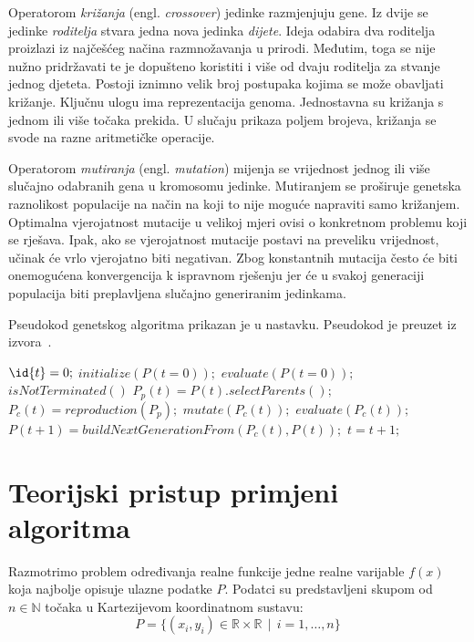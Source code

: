 \documentclass[times, utf8, seminar, numeric]{fer}
\begin{document}
Operatorom \textit{križanja} (engl. \textit{crossover}) jedinke razmjenjuju gene.
Iz dvije se jedinke \textit{roditelja} stvara jedna nova jedinka \textit{dijete}.
Ideja odabira dva roditelja proizlazi iz najčešćeg načina razmnožavanja u prirodi.
Međutim, toga se nije nužno pridržavati te je dopušteno koristiti i više od dvaju roditelja za stvanje jednog djeteta.
Postoji iznimno velik broj postupaka kojima se može obavljati križanje.
Ključnu ulogu ima reprezentacija genoma.
Jednostavna su križanja s jednom ili više točaka prekida.
U slučaju prikaza poljem brojeva, križanja se svode na razne aritmetičke operacije.

Operatorom \textit{mutiranja} (engl. \textit{mutation}) mijenja se vrijednost jednog ili više slučajno odabranih gena u kromosomu jedinke.
Mutiranjem se proširuje genetska raznolikost populacije na način na koji to nije moguće napraviti samo križanjem.
Optimalna vjerojatnost mutacije u velikoj mjeri ovisi o konkretnom problemu koji se rješava.
Ipak, ako se vjerojatnost mutacije postavi na preveliku vrijednost, učinak će vrlo vjerojatno biti negativan.
Zbog konstantnih mutacija često će biti onemogućena konvergencija k ispravnom rješenju jer će u svakoj generaciji populacija biti preplavljena slučajno generiranim jedinkama.

Pseudokod genetskog algoritma prikazan je u nastavku. Pseudokod je preuzet iz izvora~\cite{GaPseudocode}.
\begin{codebox}
	\li $\id{t} = 0;$
	\li $initialize(P(t=0));$
	\li $evaluate(P(t=0));$
	\li \While $isNotTerminated()$ \Do
	\li $P_p(t) = P(t).select Parents();$
	\li $P_c(t) = reproduction(P_p);$
	\li $mutate(P_c(t));$
	\li $evaluate(P_c(t));$
	\li $P(t+1) = buildNextGenerationFrom(P_c(t), P(t));$
	\li $t=t+1;$
	\End
\end{codebox}


\chapter{Teorijski pristup primjeni algoritma}

Razmotrimo problem određivanja realne funkcije jedne realne varijable $f(x)$ koja najbolje opisuje ulazne podatke $P$.
Podatci su predstavljeni skupom od $n \in \mathbb{N}$ točaka u Kartezijevom koordinatnom sustavu:
\begin{equation}
	P = \{(x_i, y_i) \in \mathbb{R} \times \mathbb{R}\ \ |\ \ i = 1, \dots, n\} \label{eq:P}
\end{equation}
\end{document}
